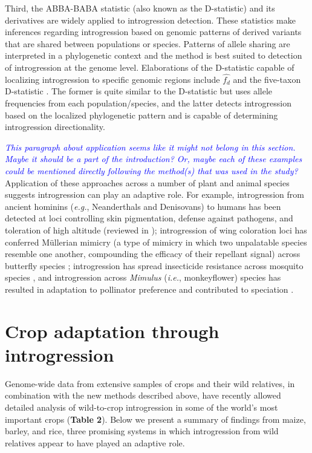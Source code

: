 \documentclass[11pt]{article}
\newcommand{\mbh}[1]{\textcolor{orange}{ \emph{\scriptsize  #1}} } %
\newcommand{\gmj}[1]{\textcolor{blue}{ \emph{\scriptsize  #1}} } %
\begin{document}
Third, the ABBA-BABA statistic (also known as the D-statistic) and its derivatives are widely applied to introgression detection.
These statistics make inferences regarding introgression based on genomic patterns of derived variants that are shared between populations or species.
Patterns of allele sharing are interpreted in a phylogenetic context and the method is best suited to detection of introgression at the genome level.
Elaborations of the D-statistic capable of localizing introgression to specific genomic regions include $\hat{f_{d}}$ \cite{Martin2015} and the five-taxon D-statistic \cite{pease2015}.
The former is quite similar to the D-statistic but uses allele frequencies from each population/species, and the latter detects introgression based on the localized phylogenetic pattern and is capable of determining introgression directionality.

\gmj{This paragraph about application seems like it might not belong in this section.  Maybe it should be a part of the introduction?  Or, maybe each of these examples could be mentioned directly following the method(s) that was used in the study?}Application of these approaches across a number of plant and animal species suggests introgression can play an adaptive role.
For example, introgression from ancient hominins (\emph{e.g.}, Neanderthals and Denisovans) to humans has been detected at loci controlling skin pigmentation, defense against pathogens, and toleration of high altitude (reviewed in \cite{Racimo2015});
introgression of wing coloration loci has conferred M\"{u}llerian mimicry
(a type of mimicry in which two unpalatable species resemble one another, compounding the efficacy of their repellant signal)
across butterfly species \cite{Heliconius2012}; introgression has spread insecticide resistance across mosquito species \cite{Norris2015}, and introgression across \emph{Mimulus} (\emph{i.e.}, monkeyflower) species has resulted in adaptation to pollinator preference and contributed to speciation \cite{Stankowski2015}.






\section*{Crop adaptation through introgression}

Genome-wide data from extensive samples of crops and their wild relatives, in combination with the new methods described above, have recently allowed detailed analysis of wild-to-crop introgression in some of the world's most important crops (\textbf{Table 2}).
Below we present a summary of findings from maize, barley, and rice, three promising systems in which introgression from wild relatives appear to have played an adaptive role.
\end{document}
